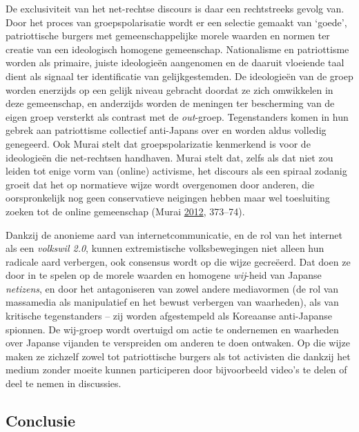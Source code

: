 \documentclass[10.5pt,dutch,]{article}
\begin{document}
De exclusiviteit van het net-rechtse discours is daar een rechtstreeks
gevolg van. Door het proces van groepspolarisatie wordt er een selectie
gemaakt van `goede', patriottische burgers met gemeenschappelijke morele
waarden en normen ter creatie van een ideologisch homogene gemeenschap.
Nationalisme en patriottisme worden als primaire, juiste ideologieën
aangenomen en de daaruit vloeiende taal dient als signaal ter
identificatie van gelijkgestemden. De ideologieën van de groep worden
enerzijds op een gelijk niveau gebracht doordat ze zich omwikkelen in
deze gemeenschap, en anderzijds worden de meningen ter bescherming van
de eigen groep versterkt als contrast met de \emph{out}-groep.
Tegenstanders komen in hun gebrek aan patriottisme collectief
anti-Japans over en worden aldus volledig genegeerd. Ook Murai stelt dat
groepspolarizatie kenmerkend is voor de ideologieën die net-rechtsen
handhaven. Murai stelt dat, zelfs als dat niet zou leiden tot enige vorm
van (online) activisme, het discours als een spiraal zodanig groeit dat
het op normatieve wijze wordt overgenomen door anderen, die
oorspronkelijk nog geen conservatieve neigingen hebben maar wel
toesluiting zoeken tot de online gemeenschap (Murai
\protect\hyperlink{ref-muraiux5fnetux5f2012}{2012}, 373--74).

Dankzij de anonieme aard van internetcommunicatie, en de rol van het
internet als een \emph{volkswil 2.0}, kunnen extremistische
volksbewegingen niet alleen hun radicale aard verbergen, ook consensus
wordt op die wijze gecreëerd. Dat doen ze door in te spelen op de morele
waarden en homogene \emph{wij}-heid van Japanse \emph{netizens}, en door
het antagoniseren van zowel andere mediavormen (de rol van massamedia
als manipulatief en het bewust verbergen van waarheden), als van
kritische tegenstanders -- zij worden afgestempeld als Koreaanse
anti-Japanse spionnen. De wij-groep wordt overtuigd om actie te
ondernemen en waarheden over Japanse vijanden te verspreiden om anderen
te doen ontwaken. Op die wijze maken ze zichzelf zowel tot patriottische
burgers als tot activisten die dankzij het medium zonder moeite kunnen
participeren door bijvoorbeeld video's te delen of deel te nemen in
discussies.

\subsection{Conclusie}\label{conclusie}
\end{document}
